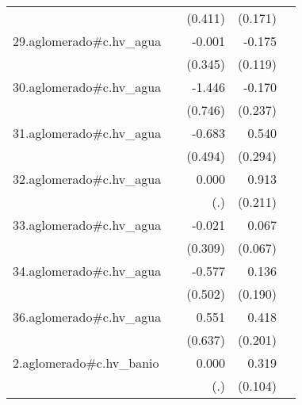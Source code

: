 {\begin{longtable}{l*{4}{D{.}{.}{-1}}}
            &                     &     (0.411)         &     (0.171)         &                     \\
\addlinespace
29.aglomerado#c.hv\_agua&                     &      -0.001         &      -0.175         &                     \\
            &                     &     (0.345)         &     (0.119)         &                     \\
\addlinespace
30.aglomerado#c.hv\_agua&                     &      -1.446         &      -0.170         &                     \\
            &                     &     (0.746)         &     (0.237)         &                     \\
\addlinespace
31.aglomerado#c.hv\_agua&                     &      -0.683         &       0.540         &                     \\
            &                     &     (0.494)         &     (0.294)         &                     \\
\addlinespace
32.aglomerado#c.hv\_agua&                     &       0.000         &       0.913\sym{***}&                     \\
            &                     &         (.)         &     (0.211)         &                     \\
\addlinespace
33.aglomerado#c.hv\_agua&                     &      -0.021         &       0.067         &                     \\
            &                     &     (0.309)         &     (0.067)         &                     \\
\addlinespace
34.aglomerado#c.hv\_agua&                     &      -0.577         &       0.136         &                     \\
            &                     &     (0.502)         &     (0.190)         &                     \\
\addlinespace
36.aglomerado#c.hv\_agua&                     &       0.551         &       0.418\sym{*}  &                     \\
            &                     &     (0.637)         &     (0.201)         &                     \\
\addlinespace
2.aglomerado#c.hv\_banio&                     &       0.000         &       0.319\sym{**} &                     \\
            &                     &         (.)         &     (0.104)         &                     \\

\end{longtable}}
